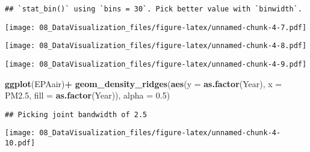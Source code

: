 \documentclass[
]{article}
\newenvironment{Shaded}{\begin{snugshade}}{\end{snugshade}}
\newcommand{\DataTypeTok}[1]{\textcolor[rgb]{0.13,0.29,0.53}{#1}}
\newcommand{\DecValTok}[1]{\textcolor[rgb]{0.00,0.00,0.81}{#1}}
\newcommand{\FloatTok}[1]{\textcolor[rgb]{0.00,0.00,0.81}{#1}}
\newcommand{\KeywordTok}[1]{\textcolor[rgb]{0.13,0.29,0.53}{\textbf{#1}}}
\newcommand{\NormalTok}[1]{#1}
\newcommand{\OperatorTok}[1]{\textcolor[rgb]{0.81,0.36,0.00}{\textbf{#1}}}
\newcommand{\StringTok}[1]{\textcolor[rgb]{0.31,0.60,0.02}{#1}}
\begin{document}
\begin{verbatim}
## `stat_bin()` using `bins = 30`. Pick better value with `binwidth`.
\end{verbatim}

\texttt{[image: 08\_DataVisualization\_files/figure-latex/unnamed-chunk-4-7.pdf]}

\begin{Shaded}
\end{Shaded}

\texttt{[image: 08\_DataVisualization\_files/figure-latex/unnamed-chunk-4-8.pdf]}

\begin{Shaded}
\end{Shaded}

\texttt{[image: 08\_DataVisualization\_files/figure-latex/unnamed-chunk-4-9.pdf]}

\begin{Shaded}
\begin{Highlighting}[]
\KeywordTok{ggplot}\NormalTok{(EPAair)}\OperatorTok{+}
\StringTok{  }\KeywordTok{geom_density_ridges}\NormalTok{(}\KeywordTok{aes}\NormalTok{(}\DataTypeTok{y =} \KeywordTok{as.factor}\NormalTok{(Year), }\DataTypeTok{x =}\NormalTok{ PM2}\FloatTok{.5}\NormalTok{, }\DataTypeTok{fill =} \KeywordTok{as.factor}\NormalTok{(Year)), }\DataTypeTok{alpha =} \FloatTok{0.5}\NormalTok{)}
\end{Highlighting}
\end{Shaded}

\begin{verbatim}
## Picking joint bandwidth of 2.5
\end{verbatim}

\texttt{[image: 08\_DataVisualization\_files/figure-latex/unnamed-chunk-4-10.pdf]}
\end{document}
